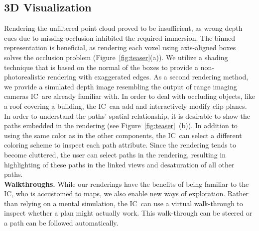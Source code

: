 \documentclass[conference,10pt,letter]{IEEEtran}
\def\IC{IC}
\begin{document}
\subsection{3D Visualization} \label{sec:overview:3dvisualization}
 Rendering the unfiltered point cloud proved to be insufficient, as wrong depth cues due to missing occlusion inhibited the required immersion. The binned representation is beneficial, as rendering each voxel using axis-aligned boxes solves the occlusion problem (Figure~\ref{fig:teaser}(a)). We utilize a shading technique that is based on the normal of the boxes to provide a non-photorealistic rendering with exaggerated edges. As a second rendering method, we provide a simulated depth image resembling the output of range imaging cameras \IC\ are already familiar with. In order to deal with occluding objects, like a roof covering a building, the \IC\ can add and interactively modify clip planes.\\
%
 In order to understand the paths' spatial relationship, it is desirable to show the paths embedded in the rendering (see Figure~\ref{fig:teaser}~(b)). In addition to using the same color as in the other components, the \IC\ can select a different coloring scheme to inspect each path attribute. Since the rendering tends to become cluttered, the user can select paths in the rendering, resulting in highlighting of these paths in the linked views and desaturation of all other paths.\\
%
\noindent \textbf{Walkthroughs.} While our renderings have the benefits of being familiar to the \IC , who is accustomed to maps, we also enable new ways of exploration. Rather than relying on a mental simulation, the \IC\ can use a virtual walk-through to inspect whether a plan might actually work. This walk-through can be steered or a path can be followed automatically.
\end{document}
